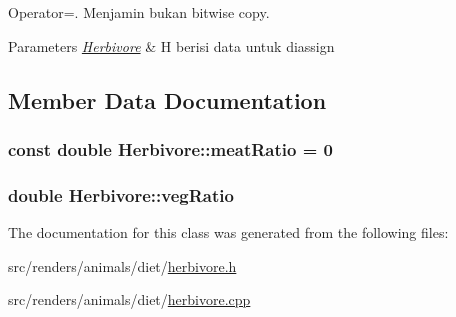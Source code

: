Operator=. Menjamin bukan bitwise copy. 


\begin{DoxyParams}{Parameters}
{\em \hyperlink{classHerbivore}{Herbivore}} & H berisi data untuk diassign \\
\hline
\end{DoxyParams}


\subsection{Member Data Documentation}
\subsubsection[{\texorpdfstring{meat\+Ratio}{meatRatio}}]{\setlength{\rightskip}{0pt plus 5cm}const double Herbivore\+::meat\+Ratio = 0\hspace{0.3cm}{\ttfamily [protected]}}\hypertarget{classHerbivore_afc971698b03df63c433e8e6300f43347}{}\label{classHerbivore_afc971698b03df63c433e8e6300f43347}
\subsubsection[{\texorpdfstring{veg\+Ratio}{vegRatio}}]{\setlength{\rightskip}{0pt plus 5cm}double Herbivore\+::veg\+Ratio\hspace{0.3cm}{\ttfamily [protected]}}\hypertarget{classHerbivore_a4d0aec1023006ba35707eb15b7092360}{}\label{classHerbivore_a4d0aec1023006ba35707eb15b7092360}


The documentation for this class was generated from the following files\+:\begin{DoxyCompactItemize}
\item 
src/renders/animals/diet/\hyperlink{herbivore_8h}{herbivore.\+h}\item 
src/renders/animals/diet/\hyperlink{herbivore_8cpp}{herbivore.\+cpp}\end{DoxyCompactItemize}
